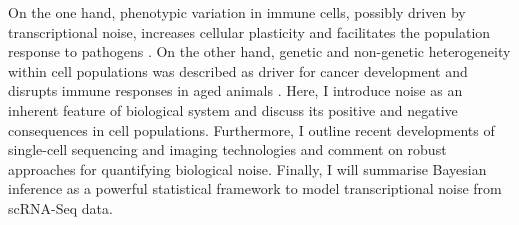 \begin{Abstract}
On the one hand, phenotypic variation in immune cells, possibly driven by transcriptional noise, increases cellular plasticity and facilitates the population response to pathogens \citep{Shalek2014, Kellogg2015}. 
On the other hand, genetic and non-genetic heterogeneity within cell populations was described as driver for cancer development \citep{Marusyk2012} and disrupts immune responses in aged animals \citep{Martinez-jimenez2017}. 
Here, I introduce noise as an inherent feature of biological system and discuss its positive and negative consequences in cell populations. 
Furthermore, I outline recent developments of single-cell sequencing and imaging technologies and comment on robust approaches for quantifying biological noise. 
Finally, I will summarise Bayesian inference as a powerful statistical framework to model transcriptional noise from \gls{scRNA-Seq} data.
\end{Abstract}

\newpage


\newpage

\newpage

\newpage

\newpage

\newpage

